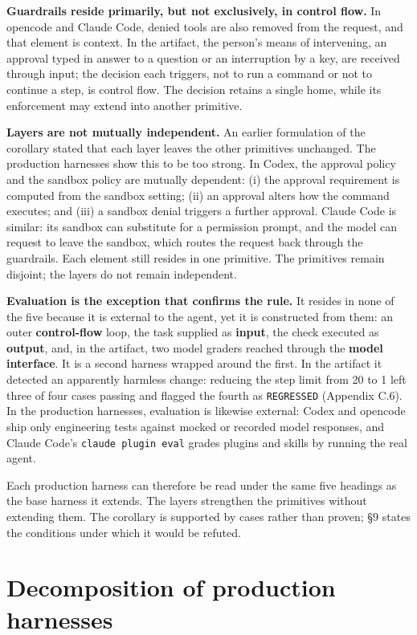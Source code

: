 \textbf{Guardrails reside primarily, but not exclusively, in control flow.} In opencode and Claude Code, denied tools are also removed from the request, and that element is context. In the artifact, the person's means of intervening, an approval typed in answer to a question or an interruption by a key, are received through input; the decision each triggers, not to run a command or not to continue a step, is control flow. The decision retains a single home, while its enforcement may extend into another primitive.

\textbf{Layers are not mutually independent.} An earlier formulation of the corollary stated that each layer leaves the other primitives unchanged. The production harnesses show this to be too strong. In Codex, the approval policy and the sandbox policy are mutually dependent: (i) the approval requirement is computed from the sandbox setting; (ii) an approval alters how the command executes; and (iii) a sandbox denial triggers a further approval. Claude Code is similar: its sandbox can substitute for a permission prompt, and the model can request to leave the sandbox, which routes the request back through the guardrails. Each element still resides in one primitive. The primitives remain disjoint; the layers do not remain independent.

\textbf{Evaluation is the exception that confirms the rule.} It resides in none of the five because it is external to the agent, yet it is constructed from them: an outer \textbf{control-flow} loop, the task supplied as \textbf{input}, the check executed as \textbf{output}, and, in the artifact, two model graders reached through the \textbf{model interface}. It is a second harness wrapped around the first. In the artifact it detected an apparently harmless change: reducing the step limit from 20 to 1 left three of four cases passing and flagged the fourth as \passthrough{\lstinline!REGRESSED!} (Appendix C.6). In the production harnesses, evaluation is likewise external: Codex and opencode ship only engineering tests against mocked or recorded model responses, and Claude Code's \passthrough{\lstinline!claude plugin eval!} grades plugins and skills by running the real agent.

Each production harness can therefore be read under the same five headings as the base harness it extends. The layers strengthen the primitives without extending them. The corollary is supported by cases rather than proven; §9 states the conditions under which it would be refuted.

\section{Decomposition of production harnesses}

